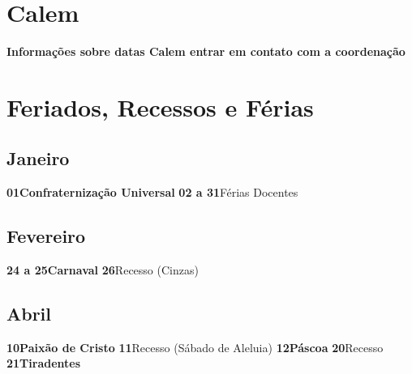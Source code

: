 \documentclass[thesis]{hmcposter}
\begin{document}
\begin{poster}
\newpage\section{\color{hmcorange}Calem}\textbf{Informações sobre datas Calem entrar em contato com a coordenação} \newpage\onespacing \small \section{\color{hmcorange}Feriados, Recessos e Férias}\subsection{Janeiro}\textbf{01}\quad \quad \quad \quad \textbf{Confraternização Universal} \newline\textbf{02 a 31}\quad \quad Férias Docentes \newline\subsection{Fevereiro}\textbf{24 a 25}\quad \quad \textbf{Carnaval} \newline\textbf{26}\quad \quad \quad \quad Recesso (Cinzas) \newline\subsection{Abril}\textbf{10}\quad \quad \quad \quad \textbf{Paixão de Cristo} \newline\textbf{11}\quad \quad \quad \quad Recesso (Sábado de Aleluia) \newline\textbf{12}\quad \quad \quad \quad \textbf{Páscoa} \newline\textbf{20}\quad \quad \quad \quad Recesso \newline\textbf{21}\quad \quad \quad \quad \textbf{Tiradentes} \
\end{poster}
\end{document}
